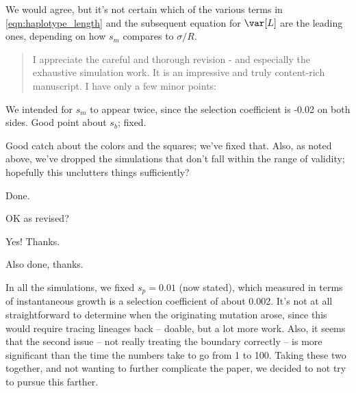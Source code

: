 \reply
We would agree, but it's not certain which of the various terms 
in \eqref{eqn:haplotype_length} and the subsequent equation for $\var[L]$
are the leading ones,
depending on how $s_m$ compares to $\sigma/R$.




\reviewersection

\begin{quote}
I appreciate the careful and thorough revision - and especially the exhaustive simulation work. It is an impressive and truly content-rich manuscript. I have only a few minor points:
\end{quote}


\reply
We intended for $s_m$ to appear twice, since the selection coefficient is -0.02 on both sides.  Good point about $s_b$; fixed.



\reply
Good catch about the colors and the squares; we've fixed that.
Also, as noted above, we've dropped the simulations that don't fall within the range of validity;
hopefully this unclutters things sufficiently?



\reply
Done.



\reply
OK as revised? \revref



\reply
Yes!  Thanks. \revref



\reply
Also done, thanks.



\reply
In all the simulations, we fixed $s_p=0.01$ (now stated),
which measured in terms of instantaneous growth is a selection coefficient of about 0.002.
It's not at all straightforward to determine when the originating mutation arose,
since this would require tracing lineages back -- doable, but a lot more work.
Also, it seems that the second issue -- not really treating the boundary correctly
-- is more significant than the time the numbers take to go from 1 to 100.
Taking these two together,
and not wanting to further complicate the paper,
we decided to not try to pursue this farther.

